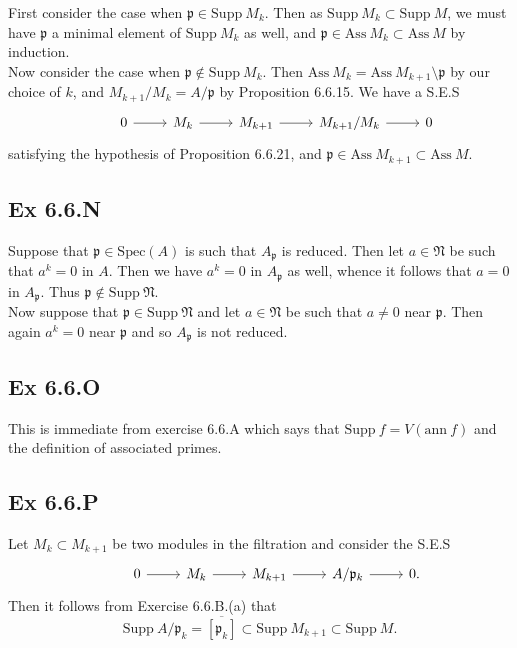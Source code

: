 \documentclass{article}
\theoremstyle{definition}
\newcommand{\Spec}{\text{Spec}}
\newcommand{\ann}{\text{ann}}
\newcommand{\Ass}{\text{Ass}}
\newcommand{\Supp}{\text{Supp}}
\begin{document}
First consider the case when $\mathfrak{p} \in \Supp\ M_k$. Then as $\Supp\ M_k
	\subset \Supp\ M$, we must have $\mathfrak{p}$ a minimal element of $\Supp\
	M_k$ as well, and $\mathfrak{p} \in \Ass\ M_k \subset \Ass\ M$ by induction. \\

Now consider the case when $\mathfrak{p} \not \in \Supp\ M_k$. Then $\Ass\ M_k
	= \Ass\ M_{k + 1} \setminus \mathfrak{p}$ by our choice of $k$, and $M_{k +
			1}/M_k = A/\mathfrak{p}$ by Proposition 6.6.15. We have a S.E.S
\[
	\begin{tikzcd}
		& 0
		\ar[r]
		& M_{k}
		\ar[r]
		& M_{k + 1}
		\ar[r]
		& M_{k + 1}/M_k
		\ar[r]
		& 0
	\end{tikzcd}
\]
satisfying the hypothesis of Proposition 6.6.21, and $\mathfrak{p} \in \Ass\
	M_{k + 1} \subset \Ass\ M$.

\subsection*{Ex 6.6.N}

Suppose that $\mathfrak{p} \in \Spec(A)$ is such that $A_{\mathfrak{p}}$ is
reduced. Then let $a \in \mathfrak{N}$ be such that $a^{k} = 0$ in $A$. Then we
have $a^{k} = 0$ in $A_{\mathfrak{p}}$ as well, whence it follows that $a = 0$
in $A_{\mathfrak{p}}$. Thus $\mathfrak{p} \not \in \Supp\ \mathfrak{N}$. \\

Now suppose that $\mathfrak{p} \in \Supp\ \mathfrak{N}$ and let $a \in
	\mathfrak{N}$ be such that $a \not = 0$ near $\mathfrak{p}$. Then again $a^{k}
	= 0$ near $\mathfrak{p}$ and so $A_{\mathfrak{p}}$ is not reduced.

\subsection*{Ex 6.6.O}

This is immediate from exercise 6.6.A which says that $\Supp\ f = V(\ann\ f)$
and the definition of associated primes.

\subsection*{Ex 6.6.P}

Let $M_k \subset M_{k + 1}$ be two modules in the filtration and consider the S.E.S
\[
	\begin{tikzcd}
		& 0
		\ar[r]
		& M_k
		\ar[r]
		& M_{k + 1}
		\ar[r]
		& A/\mathfrak{p}_{k}
		\ar[r]
		& 0.
	\end{tikzcd}
\]
Then it follows from Exercise 6.6.B.(a) that
\[
	\Supp\ A/\mathfrak{p}_k
	=
	\overline{[\mathfrak{p}_k]}
	\subset
	\Supp\ M_{k + 1}
	\subset
	\Supp\ M.
\]
\end{document}
